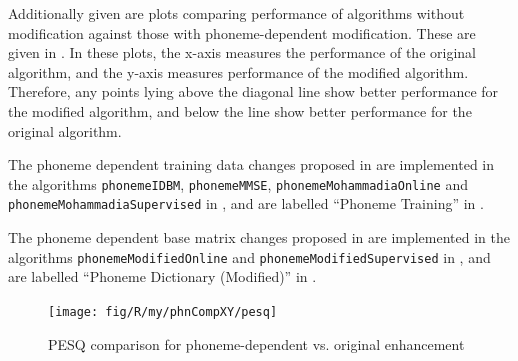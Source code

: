 Additionally given are plots comparing performance of algorithms without
modification against those with phoneme-dependent modification. These
are given in .
In these plots, the x-axis measures the performance of the original
algorithm, and the y-axis measures performance of the modified algorithm.
Therefore, any points lying above the diagonal line show better performance
for the modified algorithm, and below the line show better performance
for the original algorithm.

The phoneme dependent training data changes proposed in 
are implemented in the algorithms \lstinline[breaklines=true]!phonemeIDBM!,
\lstinline[breaklines=true]!phonemeMMSE!, \lstinline[breaklines=true]!phonemeMohammadiaOnline!
and\linebreak{}
\lstinline[breaklines=true]!phonemeMohammadiaSupervised! in ,
and are labelled ``Phoneme Training'' in .

The phoneme dependent base matrix changes proposed in 
are implemented in the algorithms \lstinline[breaklines=true]!phonemeModifiedOnline!
and \lstinline[breaklines=true]!phonemeModifiedSupervised! in ,
and are labelled ``Phoneme Dictionary (Modified)'' in .

\begin{figure}[h]
\noindent \begin{centering}
\texttt{[image: fig/R/my/phnCompXY/pesq]}
\par\end{centering}

\protect\caption{\label{fig:pesq-comparison-phn}\acs{PESQ} comparison for phoneme-dependent
vs. original enhancement}
\end{figure}


